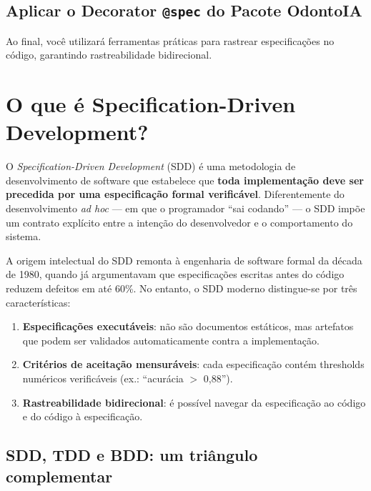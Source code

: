 \subsection{Aplicar o Decorator \texttt{@spec} do Pacote OdontoIA}
Ao final, você utilizará ferramentas práticas para rastrear especificações no código, garantindo rastreabilidade bidirecional.

\section{O que é Specification-Driven Development?}

O \textit{Specification-Driven Development} (SDD) é uma metodologia de
desenvolvimento de software que estabelece que \textbf{toda implementação
deve ser precedida por uma especificação formal verificável}. Diferentemente
do desenvolvimento \textit{ad hoc} — em que o programador ``sai codando''
— o SDD impõe um contrato explícito entre a intenção do desenvolvedor e
o comportamento do sistema.


A origem intelectual do SDD remonta à engenharia de software formal da
década de 1980, quando  já argumentavam que
especificações escritas antes do código reduzem defeitos em até 60\%.
No entanto, o SDD moderno distingue-se por três características:

\begin{enumerate}
  \item \textbf{Especificações executáveis}: não são documentos estáticos,
    mas artefatos que podem ser validados automaticamente contra a
    implementação.
  \item \textbf{Critérios de aceitação mensuráveis}: cada especificação
    contém thresholds numéricos verificáveis (ex.: ``acurácia $>$ 0,88'').
  \item \textbf{Rastreabilidade bidirecional}: é possível navegar da
    especificação ao código e do código à especificação.
\end{enumerate}


\subsection{SDD, TDD e BDD: um triângulo complementar}

